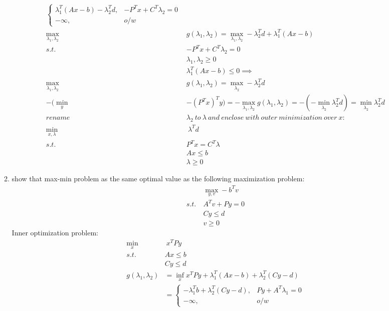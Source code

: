\documentclass[12pt,letter]{article}
\begin{document}
\begin{enumerate}
\begin{enumerate}
\begin{align*}
\begin{cases}
                             \lambda_1^T(Ax-b)-\lambda_2^Td, & -P^Tx+C^T\lambda_2 = 0\\
                             -\infty, & o/w
                           \end{cases}\\
      \max_{\lambda_1,\lambda_2}\ & g(\lambda_1,\lambda_2) = \max_{\lambda_1,\lambda_2} -\lambda_2^Td + \lambda_1^T(Ax-b)\\
      s.t.\ & -P^Tx+C^T\lambda_2 = 0\\
             &\lambda_1, \lambda_2 \geq 0\\
             & \lambda_1^T(Ax-b) \leq 0 \implies\\
      \max_{\lambda_1,\lambda_2}\ & g(\lambda_1,\lambda_2) = \max_{\lambda_2} -\lambda_2^Td\\
      -(\min_y & -(P^Tx)^T y) = - \max_{\lambda_1,\lambda_2} g(\lambda_1,\lambda_2) = -(-\min_{\lambda_2} \lambda_2^Td) = \min_{\lambda_2} \lambda_2^Td\\
             rename\ &\lambda_2\ to\ \lambda\ and\ enclose\ with\ outer\ minimization\ over\ x:\\
      \min_{x,\lambda}&\ \lambda^Td\\
      s.t.\ &P^Tx = C^T\lambda\\
             &Ax \leq b\\
             &\lambda \geq 0
    \end{align*}
    \pagebreak
  \item show that max-min problem as the same optimal value as the following maximization problem:
    \begin{align*}
      &\max_{y,v} -b^T v\\
      s.t.\ & A^Tv + Py = 0\\
      &Cy \leq d\\
      &v \geq 0
    \end{align*}
    Inner optimization problem:
    \begin{align*}
      \min_x &\ x^TPy\\
      s.t.\ &Ax \leq b\\
             &Cy \leq d
      \\
      g(\lambda_1,\lambda_2) & = \inf_x x^TPy + \lambda_1^T(Ax-b) + \lambda_2^T(Cy-d)\\
      & =
        \begin{cases}
          -\lambda_1^Tb + \lambda_2^T(Cy-d), & Py + A^T\lambda_1 = 0\\
          - \infty, & o/w
        \end{cases}\\

\end{align*}
\end{enumerate}
\end{enumerate}
\end{document}

